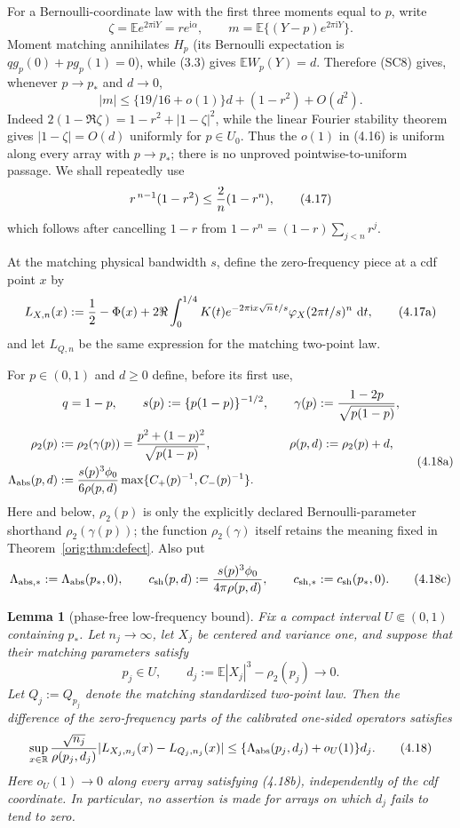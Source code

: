 \documentclass[11pt,a4paper]{article}
\numberwithin{equation}{section}
\newtheorem{lemma}[theorem]{Lemma}
\theoremstyle{definition}
\theoremstyle{remark}
\newcommand{\E}{\mathbb E}
\newcommand{\ii}{\mathrm i}
\newcommand{\dd}{\,\mathrm d}
\begin{document}
For a Bernoulli-coordinate law with the first three moments equal to $p$,
write
\[
 \zeta=\E e^{2\pi\ii Y}=r e^{\ii\alpha},\qquad
 m=\E\{(Y-p)e^{2\pi\ii Y}\}.
\]
Moment matching annihilates $H_p$ (its Bernoulli expectation is
$qg_p(0)+pg_p(1)=0$), while (3.3) gives $\E W_p(Y)=d$.  Therefore (SC8)
gives, whenever $p\to p_*$ and $d\to0$,
\[
 |m|\le\{19/16+o(1)\}d+(1-r^2)+O(d^2).                \tag{4.16}
\]
Indeed $2(1-\Re\zeta)=1-r^2+|1-\zeta|^2$, while the linear Fourier
stability theorem gives $|1-\zeta|=O(d)$ uniformly for $p\in U_0$.
Thus the $o(1)$ in (4.16) is uniform along every array with $p\to p_*$;
there is no unproved pointwise-to-uniform passage.  We shall repeatedly use
\[
 r^{\,n-1}(1-r^2)\le {2\over n}(1-r^n),              \tag{4.17}
\]
which follows after cancelling $1-r$ from
$1-r^n=(1-r)\sum_{j<n}r^j$.

At the matching physical bandwidth $s$, define the zero-frequency piece
at a cdf point $x$ by
\[
 L_{X,n}(x):={1\over2}-\Phi(x)
 +2\Re\int_0^{1/4}K(t)e^{-2\pi\ii x\sqrt n\,t/s}
        \varphi_X(2\pi t/s)^n\,\dd t,                 \tag{4.17a}
\]
and let $L_{Q,n}$ be the same expression for the matching two-point law.

For $p\in(0,1)$ and $d\ge0$ define, before its first use,
\[
 q=1-p,\qquad s(p):=\{p(1-p)\}^{-1/2},\qquad
 \gamma(p):={1-2p\over\sqrt{p(1-p)}},
\]
\[
 \begin{aligned}
 \rho_2(p)&:=\rho_2(\gamma(p))
       ={p^2+(1-p)^2\over\sqrt{p(1-p)}},
 &\qquad \rho(p,d)&:=\rho_2(p)+d,\\
 \Lambda_{\rm abs}(p,d)&:={s(p)^3\phi_0\over6\rho(p,d)}
       \max\{C_+(p)^{-1},C_-(p)^{-1}\}.
 \end{aligned}                                             \tag{4.18a}
\]
Here and below, $\rho_2(p)$ is only the explicitly declared
Bernoulli-parameter shorthand $\rho_2(\gamma(p))$; the function
$\rho_2(\gamma)$ itself retains the meaning fixed in Theorem~\ref{orig:thm:defect}.
Also put
\[
 \Lambda_{\rm abs,*}:=\Lambda_{\rm abs}(p_*,0),\qquad
 c_{\rm sh}(p,d):={s(p)^3\phi_0\over4\pi\rho(p,d)},\qquad
 c_{\rm sh,*}:=c_{\rm sh}(p_*,0).                     \tag{4.18c}
\]

\begin{lemma}[phase-free low-frequency bound]\label{orig:lem:abslow}
Fix a compact interval $U\Subset(0,1)$ containing $p_*$.  Let
$n_j\to\infty$, let $X_j$ be centered and variance one, and suppose that
their matching parameters satisfy
\[
 p_j\in U,\qquad d_j:=\E|X_j|^3-\rho_2(p_j)\longrightarrow0.       \tag{4.18b}
\]
Let \(Q_j:=Q_{p_j}\) denote the matching standardized two-point law.
Then the difference of the zero-frequency parts of the calibrated
one-sided operators satisfies
\[
 \sup_{x\in\mathbb R}{\sqrt {n_j}\over\rho(p_j,d_j)}
 |L_{X_j,n_j}(x)-L_{Q_j,n_j}(x)|
 \le\{\Lambda_{\rm abs}(p_j,d_j)+o_U(1)\}d_j.          \tag{4.18}
\]
Here $o_U(1)\to0$ along every array satisfying (4.18b), independently of
the cdf coordinate.  In particular, no assertion is made for arrays on
which $d_j$ fails to tend to zero.
\end{lemma}
\end{document}
